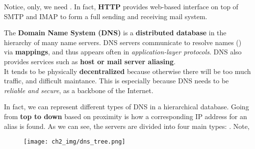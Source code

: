 \documentclass[12pt,a4paper]{article}
\begin{document}



\vspace{1.0em}

\noindent Notice,  only, we need . In fact, \textbf{HTTP} provides web-based interface on top of SMTP and IMAP to form a full sending and receiving mail system.

\vspace{1.0em}

\noindent The \textbf{Domain Name System (DNS)} is a \textbf{distributed database} in the hierarchy of many name servers. DNS servers communicate to resolve names () via \textbf{mappings}, and thus appears often in \textit{application-layer protocols}. DNS also provides services such as \textbf{host or mail server aliasing}. \\

\noindent It tends to be physically \textbf{decentralized} because otherwise there will be too much traffic, and difficult maintance. This is especially because DNS needs to be \textit{reliable and secure}, as a backbone of the Internet. \\


\noindent In fact, we can represent different types of DNS in a hierarchical database. Going from \textbf{top to down} based on proximity is how a corresponding IP address for an alias is found. As we can see, the servers are divided into four main types: . Note, 

\begin{figure}[h]
  \centering
  \texttt{[image: ch2\_img/dns\_tree.png]}
\end{figure}
\end{document}
